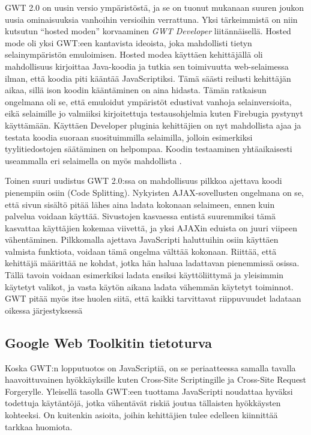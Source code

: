GWT 2.0 on uusin versio ympäristöstä, ja se on tuonut mukanaan suuren joukon uusia ominaisuuksia vanhoihin versioihin verrattuna. Yksi tärkeimmistä on niin kutsutun ``hosted moden'' 
korvaaminen \emph{GWT Developer} liitännäisellä. Hosted mode oli yksi GWT:een kantavista ideoista, joka mahdollisti tietyn selainympäristön emuloimisen. Hosted modea käyttäen 
kehittäjällä oli mahdollisuus kirjoittaa Java-koodia ja tutkia sen toimivuutta web-selaimessa ilman, että koodia piti kääntää JavaScriptiksi. Tämä säästi reilusti kehittäjän aikaa, sillä 
ison koodin kääntäminen on aina hidasta. Tämän ratkaisun ongelmana oli se, että emuloidut ympäristöt edustivat vanhoja selainversioita, eikä selaimille jo valmiiksi kirjoitettuja 
testausohjelmia kuten Firebugia pystynyt käyttämään. Käyttäen Developer pluginia kehittäjien on nyt mahdollista ajaa ja testata koodia suoraan suosituimmilla selaimilla, jolloin esimerkiksi
tyylitiedostojen säätäminen on helpompaa. Koodin testaaminen yhtäaikaisesti useammalla eri selaimella on myös mahdollista \cite{GWTnew}. 

Toinen suuri uudistus GWT 2.0:ssa on mahdollisuus pilkkoa ajettava koodi pienempiin osiin (Code Splitting). Nykyisten AJAX-sovellusten ongelmana on se, että sivun sisältö pitää lähes aina 
ladata kokonaan selaimeen, ennen kuin palvelua voidaan käyttää. Sivustojen kasvaessa entistä suuremmiksi tämä kasvattaa käyttäjien kokemaa viivettä, ja yksi AJAXin eduista on juuri
viipeen vähentäminen. Pilkkomalla ajettava JavaScripti haluttuihin osiin käyttäen valmista funktiota, voidaan tämä ongelma välttää kokonaan. Riittää, että kehittäjä määrittää ne kohdat, 
jotka hän haluaa ladattavan pienemmissä osissa. Tällä tavoin voidaan esimerkiksi ladata ensiksi käyttöliittymä ja yleisimmin käytetyt valikot, ja vasta käytön aikana ladata vähemmän 
käytetyt toiminnot. GWT pitää myös itse huolen siitä, että kaikki tarvittavat riippuvuudet ladataan oikessa järjestyksessä \cite{GWTnew}

\subsection{Google Web Toolkitin tietoturva}

Koska GWT:n lopputuotos on JavaScriptiä, on se periaatteessa samalla tavalla haavoittuvainen hyökkäyksille kuten Cross-Site Scriptingille ja Cross-Site Request Forgerylle. Yleisellä tasolla 
GWT:een tuottama JavaScripti noudattaa hyväksi todettuja käytäntöjä, jotka vähentävät riskiä joutua tällaisten hyökkäysten kohteeksi. On kuitenkin asioita, joihin kehittäjien tulee edelleen
kiinnittää tarkkaa huomiota. 

